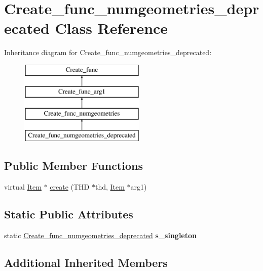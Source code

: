 \hypertarget{classCreate__func__numgeometries__deprecated}{}\section{Create\+\_\+func\+\_\+numgeometries\+\_\+deprecated Class Reference}
\label{classCreate__func__numgeometries__deprecated}
Inheritance diagram for Create\+\_\+func\+\_\+numgeometries\+\_\+deprecated\+:\begin{figure}[H]
\begin{center}
\leavevmode
\includegraphics[height=4.000000cm]{classCreate__func__numgeometries__deprecated}
\end{center}
\end{figure}
\subsection*{Public Member Functions}
\begin{DoxyCompactItemize}
\item 
virtual \mbox{\hyperlink{classItem}{Item}} $\ast$ \mbox{\hyperlink{classCreate__func__numgeometries__deprecated_aeb6f235f1d620a8b4188aacfc513c860}{create}} (T\+HD $\ast$thd, \mbox{\hyperlink{classItem}{Item}} $\ast$arg1)
\end{DoxyCompactItemize}
\subsection*{Static Public Attributes}
\begin{DoxyCompactItemize}
\item 
\mbox{\label{classCreate__func__numgeometries__deprecated_af9b101ef29775044e08b785c754a2c16}} 
static \mbox{\hyperlink{classCreate__func__numgeometries__deprecated}{Create\+\_\+func\+\_\+numgeometries\+\_\+deprecated}} {\bfseries s\+\_\+singleton}
\end{DoxyCompactItemize}
\subsection*{Additional Inherited Members}


